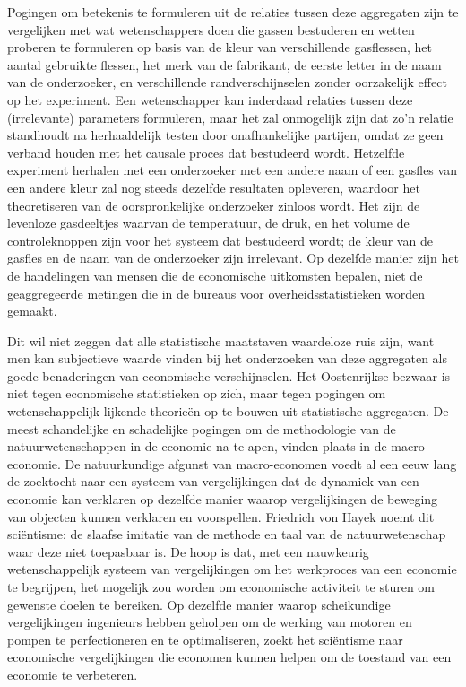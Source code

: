 Pogingen om betekenis te formuleren uit de relaties tussen deze aggregaten zijn te vergelijken met wat wetenschappers doen die gassen bestuderen en wetten proberen te formuleren op basis van de kleur van verschillende gasflessen, het aantal gebruikte flessen, het merk van de fabrikant, de eerste letter in de naam van de onderzoeker, en verschillende randverschijnselen zonder oorzakelijk effect op het experiment. Een wetenschapper kan inderdaad relaties tussen deze (irrelevante) parameters formuleren, maar het zal onmogelijk zijn dat zo’n relatie standhoudt na herhaaldelijk testen door onafhankelijke partijen, omdat ze geen verband houden met het causale proces dat bestudeerd wordt. Hetzelfde experiment herhalen met een onderzoeker met een andere naam of een gasfles van een andere kleur zal nog steeds dezelfde resultaten opleveren, waardoor het theoretiseren van de oorspronkelijke onderzoeker zinloos wordt. Het zijn de levenloze gasdeeltjes waarvan de temperatuur, de druk, en het volume de controleknoppen zijn voor het systeem dat bestudeerd wordt; de kleur van de gasfles en de naam van de onderzoeker zijn irrelevant. Op dezelfde manier zijn het de handelingen van mensen die de economische uitkomsten bepalen, niet de geaggregeerde metingen die in de bureaus voor overheidsstatistieken worden gemaakt.

Dit wil niet zeggen dat alle statistische maatstaven waardeloze ruis zijn, want men kan subjectieve waarde vinden bij het onderzoeken van deze aggregaten als goede benaderingen van economische verschijnselen. Het Oostenrijkse bezwaar is niet tegen economische statistieken op zich, maar tegen pogingen om wetenschappelijk lijkende theorieën op te bouwen uit statistische aggregaten. De meest schandelijke en schadelijke pogingen om de methodologie van de natuurwetenschappen in de economie na te apen, vinden plaats in de macro-economie. De natuurkundige afgunst van macro-economen voedt al een eeuw lang de zoektocht naar een systeem van vergelijkingen dat de dynamiek van een economie kan verklaren op dezelfde manier waarop vergelijkingen de beweging van objecten kunnen verklaren en voorspellen. Friedrich von Hayek noemt dit sciëntisme: de slaafse imitatie van de methode en taal van de natuurwetenschap waar deze niet toepasbaar is.\autocite{10} De hoop is dat, met een nauwkeurig wetenschappelijk systeem van vergelijkingen om het werkproces van een economie te begrijpen, het mogelijk zou worden om economische activiteit te sturen om gewenste doelen te bereiken. Op dezelfde manier waarop scheikundige vergelijkingen ingenieurs hebben geholpen om de werking van motoren en pompen te perfectioneren en te optimaliseren, zoekt het sciëntisme naar economische vergelijkingen die economen kunnen helpen om de toestand van een economie te verbeteren.

